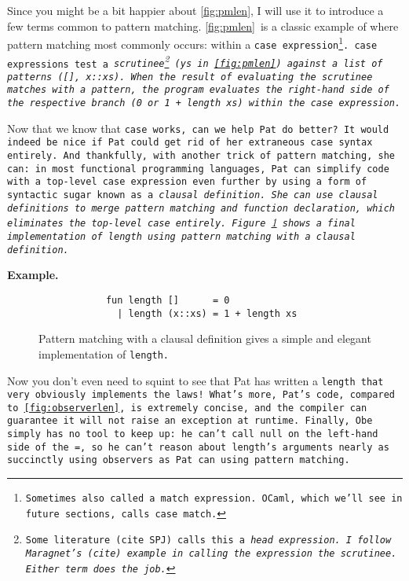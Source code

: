 \documentclass[manuscript,screen,review, 12pt]{acmart}
\begin{document}
\begin{outline}[enumerate]
    Since you might be a bit happier about \ref{fig:pmlen}, I will use it to
    introduce a few terms common to pattern matching. \ref{fig:pmlen}~is a
    classic example of where pattern matching most commonly occurs: within a
    \tt{case} expression\footnote{Sometimes also called a \tt{match expression}.
    OCaml, which we'll see in future sections, calls \tt{case} \tt{match}.}.
    \tt{case} expressions test a \it{scrutinee}\footnote{Some literature (cite
    SPJ) calls this a \it{head expression}. I follow Maragnet's (cite) example
    in calling the expression the \it{scrutinee}. Either term does the job.}
    (\tt{ys} in~\ref{fig:pmlen}) against a list of patterns (\tt{[]},
    \tt{x::xs}). When the result of evaluating the scrutinee matches with a
    pattern, the program evaluates the right-hand side of the respective branch
    (\tt{0} or \tt{1 + length xs}) within the \tt{case} expression. 

    Now that we know that \tt{case} works, can we help Pat do better? It would
    indeed be nice if Pat could get rid of her extraneous \tt{case} syntax
    entirely. And thankfully, with another trick of pattern matching, she can:
    in most functional programming languages, Pat can simplify code with a
    top-level \tt{case} expression even further by using a form of syntactic
    sugar known as a \it{clausal definition}. She can use clausal definitions to
    merge pattern matching and function declaration, which eliminates the
    top-level \tt{case} entirely. Figure~\ref{fig:pmclausallen} shows a final
    implementation of \tt{length} using pattern matching with a clausal
    definition. 
    
    \2 \bf{Example. }

    \begin{figure}[ht]
    \smllst
    \begin{verbatim}
            fun length []      = 0
              | length (x::xs) = 1 + length xs
        \end{verbatim}
    \caption{Pattern matching with a clausal definition gives a simple and 
             elegant implementation of \tt{length}.}
    \label{fig:pmclausallen}
    \end{figure}
    
    Now you don't even need to squint to see that Pat has written a \tt{length}
    that very obviously implements the laws! What's more, Pat's code, compared
    to~\ref{fig:observerlen}, is extremely concise, and the compiler can
    guarantee it will not raise an exception at runtime. Finally, Obe simply has
    no tool to keep up: he can't call \tt{null} on the left-hand side of the
    \tt{=}, so he can't reason about \tt{length}'s arguments nearly as
    succinctly using observers as Pat can using pattern matching. 



\end{outline}
\end{document}
